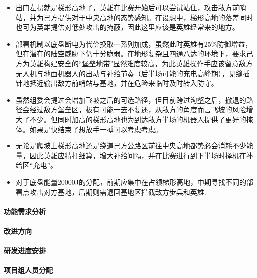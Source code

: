         \begin{itemize}
            \item 出门左拐就是梯形高地了，英雄在比赛开始后可以尝试站住，攻击敌方前哨站，并为己方提供对于中央高地的态势感知。在设想中，梯形高地的落差同时也可为英雄提供对低处攻击的掩蔽，因此这里应该是英雄经常来的地方。
            \item 部署机制以底盘断电为代价换取一系列加成，虽然此时英雄有25\%防御增益，但在潜在的陆空威胁下仍十分脆弱。在地形复杂且四通八达的环境下，要求己方为英雄构建安全的“堡垒地带”显然难度较高，为此英雄操作手应该留意敌方无人机与地面机器人的出动与补给节奏（后半场可能的充电高峰期），见缝插针地抵近输出敌方前哨站与基地，并在危险来临时及时转入防守。
            \item 虽然组委会提过会增加飞坡之后的可选路径，但目前跨过沟壑之后，撤退的路径会经过敌方堡垒区，极有可能一去不复还，从敌方的角度而言飞坡的风险增大了不少。但同时加高的梯形高地也为到达敌方半场的机器人提供了更好的掩体。如果是快结束了想放手一搏可以考虑考虑。
            \item 无论是爬坡上梯形高地还是绕道己方公路区前往中央高地都势必会消耗不少能量，因此英雄应精打细算，增大补给间隔，并在比赛进行到下半场时择机在补给区“充电”。
            \item 对于底盘能量20000J的分配，前期应集中在占领梯形高地，中期寻找不同的部署点攻击对方基地，后期则需退回基地区拦截敌方步兵和英雄.
        \end{itemize}
    
    \paragraph{功能需求分析}

    
    \paragraph{改进方向}


    \paragraph{研发进度安排}


    \paragraph{项目组人员分配}

    